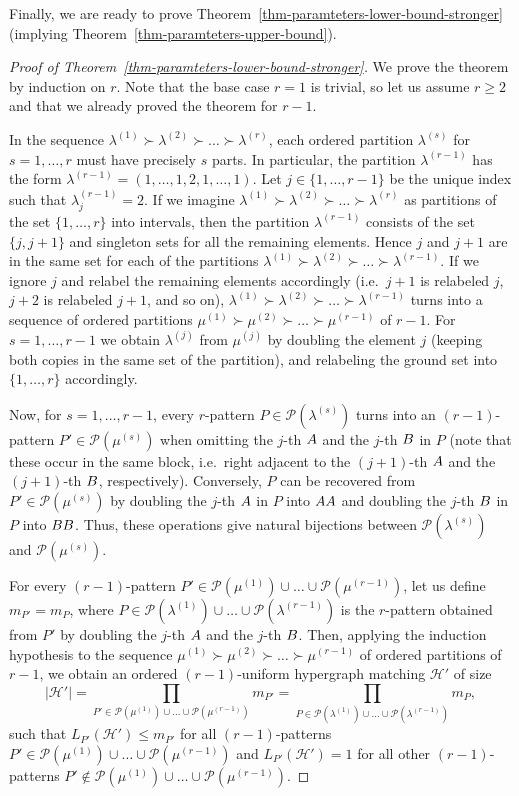 \documentclass[11pt]{article}
\theoremstyle{definition}
\numberwithin{equation}{section}
\numberwithin{figure}{section}
\newcommand{\HH}{\mathcal{H}}
\newcommand{\PP}{\mathcal{P}}
\begin{document}
Finally, we are ready to prove Theorem~\ref{thm-paramteters-lower-bound-stronger} (implying Theorem~\ref{thm-paramteters-upper-bound}).

\begin{proof}[Proof of Theorem~\ref{thm-paramteters-lower-bound-stronger}]
We prove the theorem by induction on $r$. Note that the base case $r=1$ is trivial, so let us assume $r\ge 2$ and that we already proved the theorem for $r-1$.

In the sequence $\lambda^{(1)} \succ \lambda^{(2)} \succ \dots \succ \lambda^{(r)}$, each ordered partition $\lambda^{(s)}$ for $s=1,\dots,r$ must have precisely $s$ parts. In particular, the partition $\lambda^{(r-1)}$ has the form $\lambda^{(r-1)}=(1,\dots,1,2,1,\dots,1)$. Let $j\in \{1,\dots,r-1\}$ be the unique index such that $\lambda^{(r-1)}_j=2$. If we imagine $\lambda^{(1)} \succ \lambda^{(2)} \succ \dots \succ \lambda^{(r)}$ as partitions of the set $\{1,\dots,r\}$ into intervals, then the partition  $\lambda^{(r-1)}$ consists of the set $\{j,j+1\}$ and singleton sets for all the remaining elements. Hence $j$ and $j+1$ are in the same set for each of the partitions $\lambda^{(1)} \succ \lambda^{(2)} \succ \dots \succ \lambda^{(r-1)}$. If we ignore $j$ and relabel the remaining elements accordingly (i.e.\ $j+1$ is relabeled $j$, $j+2$ is relabeled $j+1$, and so on), $\lambda^{(1)} \succ \lambda^{(2)} \succ \dots \succ \lambda^{(r-1)}$ turns into a sequence of ordered partitions $\mu^{(1)} \succ \mu^{(2)} \succ \dots \succ \mu^{(r-1)}$ of $r-1$. For $s=1,\dots,r-1$ we obtain $\lambda^{(j)}$ from $\mu^{(j)}$ by doubling the element $j$ (keeping both copies in the same set of the partition), and relabeling the ground set into $\{1,\dots,r\}$ accordingly.

Now, for $s=1,\dots,r-1$, every $r$-pattern $P\in \PP(\lambda^{(s)})$ turns into an $(r-1)$-pattern $P'\in \PP(\mu^{(s)})$ when omitting the $j$-th $\rm A$ and the $j$-th $\rm B$ in $P$ (note that these occur in the same block, i.e.\ right adjacent to the $(j+1)$-th $\rm A$ and the $(j+1)$-th $\rm B$, respectively). Conversely, $P$ can be recovered from $P'\in \PP(\mu^{(s)})$ by doubling the $j$-th $\rm A$
in $P$ into $\rm{AA}$ and doubling the $j$-th $\rm B$
in $P$ into $\rm{BB}$. Thus, these operations give natural bijections between $\PP(\lambda^{(s)})$ and $\PP(\mu^{(s)})$.

For every $(r-1)$-pattern $P'\in \PP(\mu^{(1)})\cup\dots\cup \PP(\mu^{(r-1)})$, let us define $m_{P'}=m_P$, where $P\in \PP(\lambda^{(1)})\cup\dots\cup \PP(\lambda^{(r-1)})$ is the $r$-pattern obtained from $P'$ by doubling the $j$-th $\rm A$ and the $j$-th $\rm B$. Then, applying the induction hypothesis to the sequence $\mu^{(1)} \succ \mu^{(2)} \succ \dots \succ \mu^{(r-1)}$ of ordered partitions of $r-1$, we obtain an ordered $(r-1)$-uniform hypergraph matching $\HH'$ of size
\[|\HH'|=\prod_{P'\in \PP(\mu^{(1)})\cup\dots\cup \PP(\mu^{(r-1)})} m_{P'}=\prod_{P\in \PP(\lambda^{(1)})\cup\dots\cup \PP(\lambda^{(r-1)})} m_{P},\]
such that $L_{P'}(\HH')\le m_{P'}$ for all $(r-1)$-patterns $P'\in \PP(\mu^{(1)})\cup\dots\cup \PP(\mu^{(r-1)})$ and $L_{P'}(\HH')=1$ for all other $(r-1)$-patterns $P'\not\in \PP(\mu^{(1)})\cup\dots\cup \PP(\mu^{(r-1)})$.


\end{proof}
\end{document}
